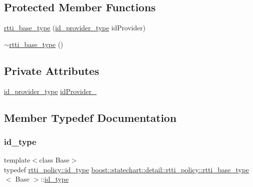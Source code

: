 \subsection*{Protected Member Functions}
\begin{DoxyCompactItemize}
\item 
\mbox{\hyperlink{classboost_1_1statechart_1_1detail_1_1rtti__policy_1_1rtti__base__type_a3dfaaff4d6944ca3bab2c94b73fe0cb9}{rtti\+\_\+base\+\_\+type}} (\mbox{\hyperlink{structboost_1_1statechart_1_1detail_1_1rtti__policy_afd9bc153e4b739bd085ea646f21c3cba}{id\+\_\+provider\+\_\+type}} id\+Provider)
\item 
\mbox{\hyperlink{classboost_1_1statechart_1_1detail_1_1rtti__policy_1_1rtti__base__type_a92a2afa63a5bc4b9f3c0b2b6d87567b3}{$\sim$rtti\+\_\+base\+\_\+type}} ()
\end{DoxyCompactItemize}
\subsection*{Private Attributes}
\begin{DoxyCompactItemize}
\item 
\mbox{\hyperlink{structboost_1_1statechart_1_1detail_1_1rtti__policy_afd9bc153e4b739bd085ea646f21c3cba}{id\+\_\+provider\+\_\+type}} \mbox{\hyperlink{classboost_1_1statechart_1_1detail_1_1rtti__policy_1_1rtti__base__type_ad336f8059924f5ea4ec637c96c79b19e}{id\+Provider\+\_\+}}
\end{DoxyCompactItemize}


\subsection{Member Typedef Documentation}
\mbox{\label{classboost_1_1statechart_1_1detail_1_1rtti__policy_1_1rtti__base__type_ad253f130608c3cec1fffdca105f17c1a}} 
\subsubsection{\texorpdfstring{id\+\_\+type}{id\_type}}
{\footnotesize\ttfamily template$<$class Base$>$ \\
typedef \mbox{\hyperlink{structboost_1_1statechart_1_1detail_1_1rtti__policy_a57d56a3531686fb2b92d733b5da620c2}{rtti\+\_\+policy\+::id\+\_\+type}} \mbox{\hyperlink{classboost_1_1statechart_1_1detail_1_1rtti__policy_1_1rtti__base__type}{boost\+::statechart\+::detail\+::rtti\+\_\+policy\+::rtti\+\_\+base\+\_\+type}}$<$ Base $>$\+::\mbox{\hyperlink{classboost_1_1statechart_1_1detail_1_1rtti__policy_1_1rtti__base__type_ad253f130608c3cec1fffdca105f17c1a}{id\+\_\+type}}}



